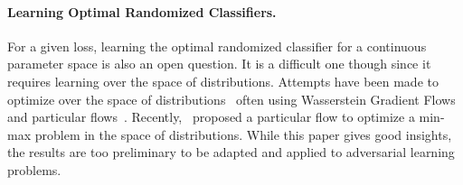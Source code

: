 \paragraph{Learning Optimal Randomized Classifiers.} For a given loss, learning the optimal randomized classifier for a continuous parameter space is also an open question.  It is a difficult one though since it requires learning over the space of distributions. Attempts have been made to optimize over the space of distributions~\citep{chizat2021sparse,chizat2021convergence,kent2021frank} often using Wasserstein Gradient Flows~\citep{ambrosio2005gradient} and particular flows~\citep{wibisono2018sampling}. Recently,~\citet{domingo2020mean} proposed a particular flow to optimize a min-max problem in the space of distributions. While this paper gives good insights, the results are too preliminary to be adapted and applied to adversarial learning problems.


